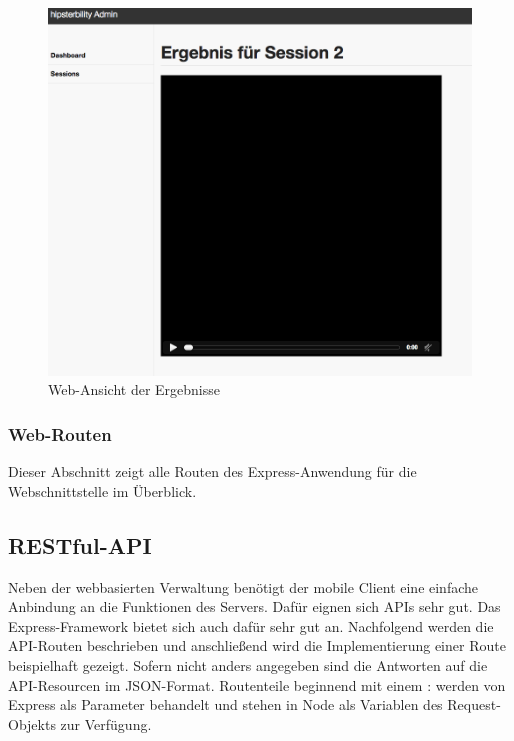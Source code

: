 \begin{figure}[h!]
	\centering
		\includegraphics[width=\linewidth,keepaspectratio]{img/session-result-page.png}
	\caption{Web-Ansicht der Ergebnisse}
	\label{fig: session-result-page}
\end{figure}

\subsubsection{Web-Routen}

Dieser Abschnitt zeigt alle Routen des Express-Anwendung für die Webschnittstelle im Überblick. 

\subsection{RESTful-API \label{sec: api}}

Neben der webbasierten Verwaltung benötigt der mobile Client eine einfache Anbindung an die Funktionen des Servers. Dafür eignen sich APIs sehr gut. Das Express-Framework bietet sich auch dafür sehr gut an. Nachfolgend werden die API-Routen beschrieben und anschließend wird die Implementierung einer Route beispielhaft gezeigt. Sofern nicht anders angegeben sind die Antworten auf die API-Resourcen im JSON-Format. Routenteile beginnend mit einem : werden von Express als Parameter behandelt und stehen in Node als Variablen des Request-Objekts zur Verfügung. 

